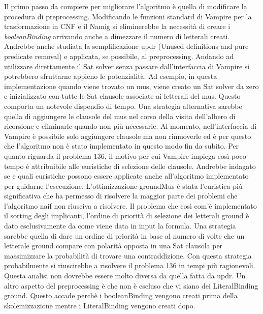 \documentclass[./main.tex]{subfiles}
\begin{document}
Il primo passo da compiere per migliorare l'algoritmo è quella di modificare la procedura di preprocessing.
Modificando le funzioni standard di Vampire per la trasformazione in CNF e il Namig si
eliminerebbe la necessità di creare i \textit{booleanBinding} arrivando anche a dimezzare il numero di letterali creati.
Andrebbe anche studiata la semplificazione updr (Unused definitions and pure predicate removal) e 
applicata, se possibile, al preprocessing.
Andando ad utilizzare direttamente il Sat solver senza passare dall'interfaccia di Vampire 
si potrebbero sfruttarne appieno le potenzialità. 
Ad esempio, in questa implementazione quando viene trovato un mus, viene creato un Sat solver da zero e inizializzato con tutte le Sat clausole associate ai letterali del mus.
Questo comporta un notevole dispendio di tempo. 
Una strategia alternativa sarebbe quella di aggiungere le clausole del mus nel corso della visita dell'albero di ricorsione 
e eliminarle quando non più necessarie. 
Al momento, nell'interfaccia di Vampire è possibile solo aggiungere clausole ma non rimuoverle ed 
è per questo che l'algoritmo non è stato implementato in questo modo fin da subito.
Per quanto riguarda il problema 136, il motivo per cui Vampire impiega così poco tempo 
è attribuibile alle euristiche di selezione delle clausole. 
Andrebbe indagato se e quali euristiche possono essere applicate anche all'algoritmo implementato per guidarne l'esecuzione.
L'ottimizzazione groundMus è stata l'euristica più significativa che ha permesso di risolvere la maggior parte dei problemi
che l'algoritmo naif non riusciva a risolvere.
Il problema che così com'è implementato il sorting degli implicanti, l'ordine di priorità di selezione dei letterali ground è dato esclusivamente da come 
viene data in input la formula. 
Una strategia sarebbe quella di dare un ordine di priorità in base al numero di volte che un letterale ground compare
con polarità opposta in una Sat clausola per massimizzare la probabilità di trovare una contraddizione.
Con questa strategia probabilmente si riuscirebbe a risolvere il problema 136 in tempi più ragionevoli.
Questa analisi non dovrebbe essere molto diversa da quella fatta da updr.
Un altro aspetto del preprocessing è che non è escluso che vi siano dei LiteralBinding ground.
Questo accade perchè i booleanBinding vengono creati prima della skolemizzazione mentre i LiteralBinding vengono creati dopo.
\end{document}
